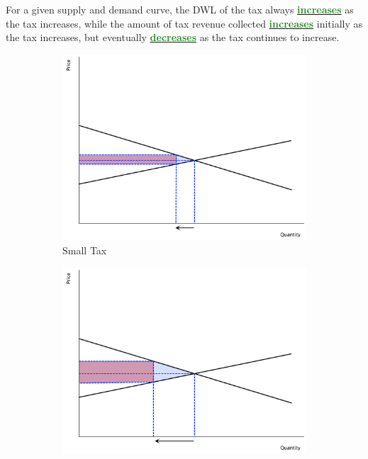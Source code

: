 \documentclass[11pt]{article}\usepackage[]{graphicx}\usepackage[]{color}
\theoremstyle{definition}
\newcommand{\dd}[1]{{\underline{\textbf{\textcolor{ForestGreen}{#1}}}}}
\begin{document}
	
	For a given supply and demand curve, the DWL of the tax always \dd{increases} as the tax increases, while the amount of tax revenue collected \dd{increases} initially as the tax increases, but eventually \dd{decreases} as the tax continues to increase.
	
		\begin{figure}[H]
			\centering
			\caption{Taxes, DWL, and Tax Revenue}
			\begin{subfigure}{.3\textwidth}
				\includegraphics[scale=.2]{plot47.pdf}
				\caption{Small Tax}
			\end{subfigure}%
			\begin{subfigure}{.3\textwidth}
				\centering
				\includegraphics[scale=.2]{plot48.pdf}

\end{subfigure}
\end{figure}
\end{document}

